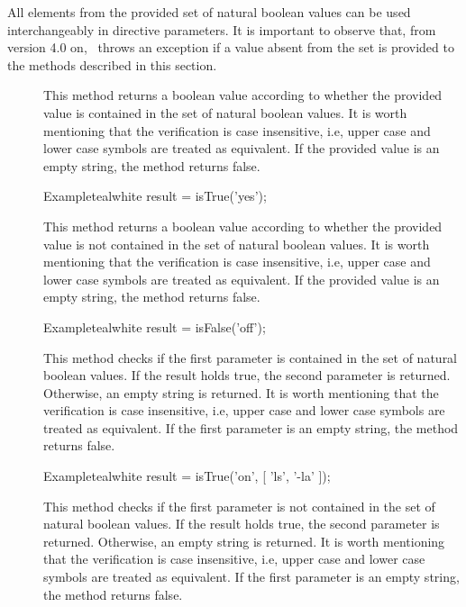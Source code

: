 \vspace{1.4em}

All elements from the provided set of natural boolean values can be used interchangeably in directive parameters. It is important to observe that, from version 4.0 on, \arara\ throws an exception if a value absent from the set is provided to the methods described in this section.

\begin{description}
\item[] This method returns a boolean value according to whether the provided  value is contained in the set of natural boolean values. It is worth mentioning that the verification is case insensitive, i.e, upper case and lower case symbols are treated as equivalent. If the provided value is an empty string, the method returns false.

\begin{codebox}{Example}{teal}{\icnote}{white}
result = isTrue('yes');
\end{codebox}

\item[] This method returns a boolean value according to whether the provided  value is not contained in the set of natural boolean values. It is worth mentioning that the verification is case insensitive, i.e, upper case and lower case symbols are treated as equivalent. If the provided value is an empty string, the method returns false.

\begin{codebox}{Example}{teal}{\icnote}{white}
result = isFalse('off');
\end{codebox}

\item[] This method checks if the first parameter is contained in the set of natural boolean values. If the result holds true, the second parameter is returned. Otherwise, an empty string is returned. It is worth mentioning that the verification is case insensitive, i.e, upper case and lower case symbols are treated as equivalent. If the first parameter is an empty string, the method returns false.

\begin{codebox}{Example}{teal}{\icnote}{white}
result = isTrue('on', [ 'ls', '-la' ]);
\end{codebox}

\item[] This method checks if the first parameter is not contained in the set of natural boolean values. If the result holds true, the second parameter is returned. Otherwise, an empty string is returned. It is worth mentioning that the verification is case insensitive, i.e, upper case and lower case symbols are treated as equivalent. If the first parameter is an empty string, the method returns false.


\end{description}
